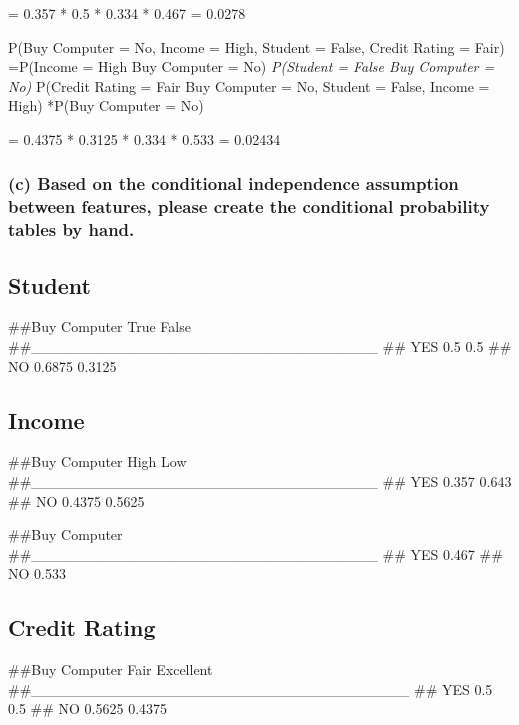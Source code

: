 \documentclass[]{article}
\begin{document}
= 0.357 * 0.5 * 0.334 * 0.467 = 0.0278

P(Buy Computer = No, Income = High, Student = False, Credit Rating =
Fair) =P(Income = High \textbar{} Buy Computer = No) \emph{P(Student =
False \textbar{} Buy Computer = No) }P(Credit Rating = Fair \textbar{}
Buy Computer = No, Student = False, Income = High) *P(Buy Computer = No)

= 0.4375 * 0.3125 * 0.334 * 0.533 = 0.02434

\hypertarget{c-based-on-the-conditional-independence-assumption-between-features-please-create-the-conditional-probability-tables-by-hand.}{%
\subsubsection{(c) Based on the conditional independence assumption
between features, please create the conditional probability tables by
hand.}\label{c-based-on-the-conditional-independence-assumption-between-features-please-create-the-conditional-probability-tables-by-hand.}}

\hypertarget{student-1}{%
\subsection{Student}\label{student-1}}

\#\#Buy Computer \textbar{} True False
\#\#\_\_\_\_\_\_\_\_\_\_\_\_\_\_\_\_\_\_\_\_\_\_\_\_\_\_\_\_\_\_\_\_\_
\#\# YES \textbar{} 0.5 0.5 \#\# NO \textbar{} 0.6875 0.3125

\hypertarget{income-1}{%
\subsection{Income}\label{income-1}}

\#\#Buy Computer \textbar{} High Low
\#\#\_\_\_\_\_\_\_\_\_\_\_\_\_\_\_\_\_\_\_\_\_\_\_\_\_\_\_\_\_\_\_\_\_
\#\# YES \textbar{} 0.357 0.643 \#\# NO \textbar{} 0.4375 0.5625

\#\#Buy Computer\\
\#\#\_\_\_\_\_\_\_\_\_\_\_\_\_\_\_\_\_\_\_\_\_\_\_\_\_\_\_\_\_\_\_\_\_
\#\# YES \textbar{} 0.467 \#\# NO \textbar{} 0.533

\hypertarget{credit-rating-1}{%
\subsection{Credit Rating}\label{credit-rating-1}}

\#\#Buy Computer \textbar{} Fair Excellent
\#\#\_\_\_\_\_\_\_\_\_\_\_\_\_\_\_\_\_\_\_\_\_\_\_\_\_\_\_\_\_\_\_\_\_\_\_\_
\#\# YES \textbar{} 0.5 0.5 \#\# NO \textbar{} 0.5625 0.4375
\end{document}
